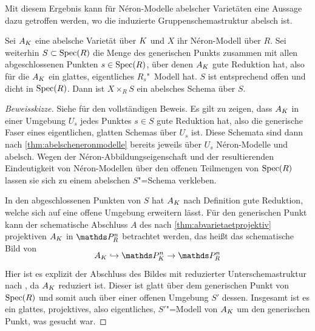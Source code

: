Mit diesem Ergebnis kann für Néron-Modelle abelscher Varietäten
eine Aussage dazu getroffen werden, wo die induzierte
Gruppenschemastruktur abelsch ist.
\begin{Satz}\label{thm:teilwabelscheneronmodelle}
  Sei $A_{K}$ eine abelsche Varietät über $K$
  und $X$ ihr Néron-Modell über $R$.
  Sei weiterhin ${S\subset\operatorname{Spec}(R)}$ die Menge des generischen Punkts
  zusammen mit allen abgeschlossenen Punkten ${s\in\operatorname{Spec}(R)}$, über
  denen $A_{K}$ gute Reduktion hat, also für die $A_{K}$ ein glattes,
  eigentliches $R_s$"~Mo\-dell hat.
  $S$ ist entsprechend offen und dicht in $\operatorname{Spec}(R)$.
  Dann ist $X\times_R S$ ein abelsches Schema über $S$.
  \begin{proof}[Beweisskizze] Siehe \cite[Theorem~1.4/3]{neron} für
    den vollständigen Beweis.
    Es gilt zu zeigen, dass $A_{K}$ in einer Umgebung $U_s$ jedes
    Punktes $s\in S$ gute Reduktion hat, also die generische Faser eines
    eigentlichen, glatten Schemas über $U_s$ ist.
    Diese Schemata sind dann nach \ref{thm:abelscheneronmodelle}
    bereits jeweils über $U_s$ Néron-Modelle und abelsch.
    Wegen der Néron-Abbildungseigenschaft und der resultierenden Eindeutigkeit von
    Néron-Modellen über den offenen Teilmengen von $\operatorname{Spec}(R)$
    lassen sie sich zu einem abelschen $S$"=Schema verkleben.

    In den abgeschlossenen Punkten von $S$ hat $A_{K}$ nach Definition
    gute Reduktion, welche sich auf eine offene Umgebung erweitern
    lässt.
    Für den generischen Punkt kann der schematische
    Abschluss $A$ des nach \ref{thm:abvarietaetprojektiv} projektiven
    $A_{K}$ in $\P_R^n$ betrachtet werden, das heißt das schematische
    Bild von
    \begin{gather*}
      \SwapAboveDisplaySkip
      A_\K\hookrightarrow\P_\K^n\to\P_R^n
    \end{gather*}
    Hier ist es explizit der Abschluss des Bildes mit reduzierter
    Unterschemastruktur nach \cite[Remark~10.32]{wedhorn}, da $A_{K}$
    reduziert ist.
    Dieser ist glatt über dem generischen Punkt von $\operatorname{Spec}(R)$
    und somit auch über einer offenen Umgebung $S'$ dessen.
    Insgesamt ist es ein glattes, projektives, also eigentliches,
    $S'$"=Modell von $A_{K}$ um den generischen Punkt, was gesucht war.
  \end{proof}
\end{Satz}

